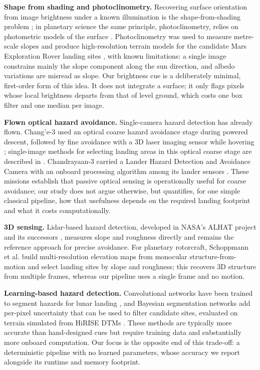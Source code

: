 \documentclass{article}
\begin{document}
\textbf{Shape from shading and photoclinometry.} Recovering surface orientation from image brightness under a known illumination is the shape-from-shading problem \cite{horn1970shape,zhang1999sfs}; in planetary science the same principle, photoclinometry, relies on photometric models of the surface \cite{mcewen1991photometric}. Photoclinometry was used to measure metre-scale slopes and produce high-resolution terrain models for the candidate Mars Exploration Rover landing sites \cite{beyer2003meter,kirk2003topomapping}, with known limitations: a single image constrains mainly the slope component along the sun direction, and albedo variations are misread as slope. Our brightness cue is a deliberately minimal, first-order form of this idea. It does not integrate a surface; it only flags pixels whose local brightness departs from that of level ground, which costs one box filter and one median per image.

\textbf{Flown optical hazard avoidance.} Single-camera hazard detection has already flown. Chang'e-3 used an optical coarse hazard avoidance stage during powered descent, followed by fine avoidance with a 3D laser imaging sensor while hovering \cite{li2016change3}; single-image methods for selecting landing areas in this optical coarse stage are described in \cite{wei2018landing}. Chandrayaan-3 carried a Lander Hazard Detection and Avoidance Camera with an onboard processing algorithm among its lander sensors \cite{isro2023ch3}. These missions establish that passive optical sensing is operationally useful for coarse avoidance; our study does not argue otherwise, but quantifies, for one simple classical pipeline, how that usefulness depends on the required landing footprint and what it costs computationally.

\textbf{3D sensing.} Lidar-based hazard detection, developed in NASA's ALHAT project \cite{epp2008alhat,amzajerdian2013lidar} and its successors \cite{restrepo2020hds}, measures slope and roughness directly and remains the reference approach for precise avoidance. For planetary rotorcraft, Schoppmann et al. \cite{schoppmann2021multi} build multi-resolution elevation maps from monocular structure-from-motion and select landing sites by slope and roughness; this recovers 3D structure from multiple frames, whereas our pipeline uses a single frame and no motion.

\textbf{Learning-based hazard detection.} Convolutional networks have been trained to segment hazards for lunar landing \cite{moghe2020deep}, and Bayesian segmentation networks add per-pixel uncertainty that can be used to filter candidate sites, evaluated on terrain simulated from HiRISE DTMs \cite{tomita2022bayesian}. These methods are typically more accurate than hand-designed cues but require training data and substantially more onboard computation. Our focus is the opposite end of this trade-off: a deterministic pipeline with no learned parameters, whose accuracy we report alongside its runtime and memory footprint.
\end{document}
